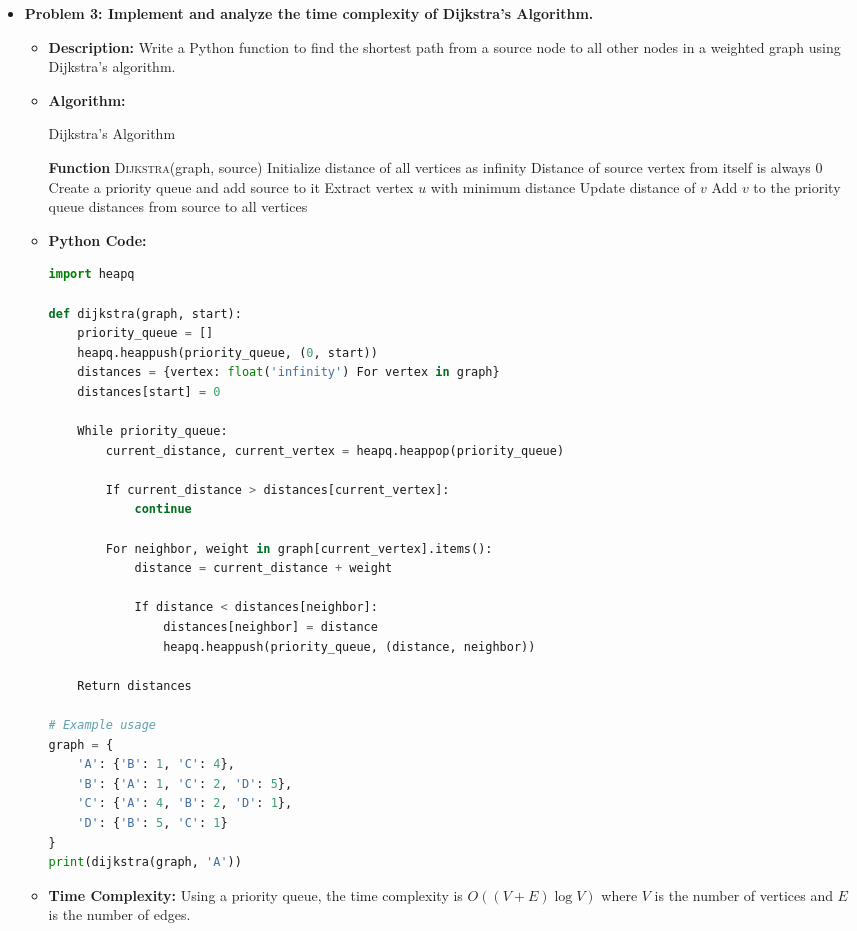 \documentclass[12pt]{book} %
\begin{document}
\begin{itemize}
    \item \textbf{Problem 3: Implement and analyze the time complexity of Dijkstra's Algorithm.}
    \begin{itemize}
        \item \textbf{Description:} Write a Python function to find the shortest path from a source node to all other nodes in a weighted graph using Dijkstra's algorithm.
        \item \textbf{Algorithm:}
        \begin{algorithm}
        \caption{Dijkstra's Algorithm}
        \begin{algorithmic}
            \State \textbf{Function} \textsc{Dijkstra}(graph, source)
            \State Initialize distance of all vertices as infinity
            \State Distance of source vertex from itself is always 0
            \State Create a priority queue and add source to it
                \State Extract vertex $u$ with minimum distance
                        \State Update distance of $v$
                        \State Add $v$ to the priority queue
                    \EndIf
                \EndFor
            \EndWhile
            \Return distances from source to all vertices
        \end{algorithmic}
        \end{algorithm}
        \item \textbf{Python Code:}
        \FloatBarrier
        \begin{lstlisting}[language=Python]
import heapq

def dijkstra(graph, start):
    priority_queue = []
    heapq.heappush(priority_queue, (0, start))
    distances = {vertex: float('infinity') For vertex in graph}
    distances[start] = 0

    While priority_queue:
        current_distance, current_vertex = heapq.heappop(priority_queue)

        If current_distance > distances[current_vertex]:
            continue

        For neighbor, weight in graph[current_vertex].items():
            distance = current_distance + weight

            If distance < distances[neighbor]:
                distances[neighbor] = distance
                heapq.heappush(priority_queue, (distance, neighbor))

    Return distances

# Example usage
graph = {
    'A': {'B': 1, 'C': 4},
    'B': {'A': 1, 'C': 2, 'D': 5},
    'C': {'A': 4, 'B': 2, 'D': 1},
    'D': {'B': 5, 'C': 1}
}
print(dijkstra(graph, 'A'))
        \end{lstlisting}
        \FloatBarrier
        \item \textbf{Time Complexity:} Using a priority queue, the time complexity is $O((V + E) \log V)$ where $V$ is the number of vertices and $E$ is the number of edges.
    \end{itemize}
\end{itemize}
\end{document}
